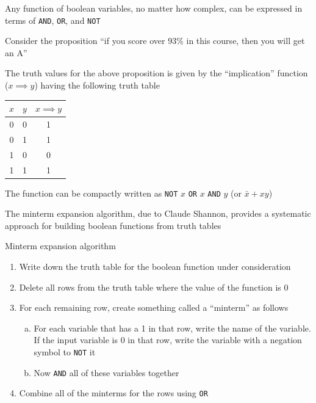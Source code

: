 \documentclass[8pt,a4paper,compress]{beamer}
\begin{document}
\begin{frame}[fragile]
\pause

Any function of boolean variables, no matter how complex, can be expressed in terms of \lstinline{AND}, \lstinline{OR}, and \lstinline{NOT}

\pause
\bigskip

Consider the proposition ``if you score over 93\% in this course, then you will get an A''

\pause
\bigskip

The truth values for the above proposition is given by the ``implication'' function ($x \implies y$) having the following truth table

\begin{center}
\begin{tabular}{cc|c}
$x$ & $y$ & $x \implies y$ \\ \hline
0 & 0 & 1 \\
0 & 1 & 1 \\
1 & 0 & 0 \\
1 & 1 & 1
\end{tabular}
\end{center}

\pause
\bigskip

The function can be compactly written as \lstinline{NOT} $x$ \lstinline{OR} $x$ \lstinline{AND} $y$ (or $\bar{x}+xy$)
\end{frame}

\begin{frame}[fragile]
\pause

The minterm expansion algorithm, due to Claude Shannon, provides a systematic approach for building boolean functions from truth tables

\pause
\bigskip

Minterm expansion algorithm
\begin{enumerate}
\pause
\item Write down the truth table for the boolean function under consideration

\pause
\item Delete all rows from the truth table where the value of the function is 0

\pause
\item For each remaining row, create something called a ``minterm'' as follows
\begin{enumerate}[a.]
\pause
\item For each variable that has a 1 in that row, write the name of the variable. If the input variable is 0 in that row, write the variable with a negation symbol to \lstinline{NOT} it

\pause
\item Now \lstinline{AND} all of these variables together
\end{enumerate}

\pause
\item Combine all of the minterms for the rows using \lstinline{OR}
\end{enumerate}
\end{frame}
\end{document}
